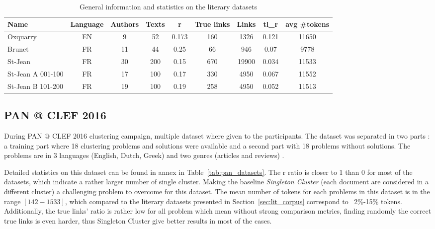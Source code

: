 \begin{table*}[]
  \centering
  \caption{General information and statistics on the literary datasets}
  \label{tab:lit_datasets}
  \begin{tabular}{ l c c c c c c c c }
    \toprule
    \textbf{Name} &
    \textbf{Language} &
    \textbf{Authors} &
    \textbf{Texts} &
    \textbf{r} &
    \textbf{True links} &
    \textbf{Links} &
    \textbf{tl\_r} &
    \textbf{avg \#tokens} \\
    \midrule
    Oxquarry & EN & 9 & 52 & 0.173 & 160 & 1326 & 0.121 & 11650 \\
    Brunet & FR & 11 & 44 & 0.25 & 66 & 946 & 0.07 & 9778 \\
    St-Jean & FR & 30 & 200 & 0.15 & 670 & 19900 & 0.034 & 11533 \\
    St-Jean A 001-100 & FR & 17 & 100 & 0.17 & 330 & 4950 & 0.067 & 11552 \\
    St-Jean B 101-200 & FR & 19 & 100 & 0.19 & 258 & 4950 & 0.052 & 11513 \\
    \bottomrule
  \end{tabular}
\end{table*}


\subsection{PAN @ CLEF 2016}

During PAN @ CLEF 2016 clustering campaign, multiple dataset where given to the participants.
The dataset was separated in two parts : a training part where 18 clustering problems and solutions were available and a second part with 18 problems without solutions.
The problems are in 3 languages (English, Dutch, Greek) and two genres (articles and reviews) \cite{pan16}.

Detailed statistics on this dataset can be found in annex in Table~\ref{tab:pan_datasets}.
The r ratio is closer to 1 than 0 for most of the datasets, which indicate a rather larger number of single cluster.
Making the baseline \textit{Singleton Cluster} (each document are considered in a different cluster) a challenging problem to overcome for this dataset.
The mean number of tokens for each problems in this dataset is in the range $[142-1533]$, which compared to the literary datasets presented in Section~\ref{sec:lit_corpus} correspond to ~2\%-15\% tokens.
Additionally, the true links' ratio is rather low for all problem which mean without strong comparison metrics, finding randomly the correct true links is even harder, thus Singleton Cluster give better results in most of the cases.
